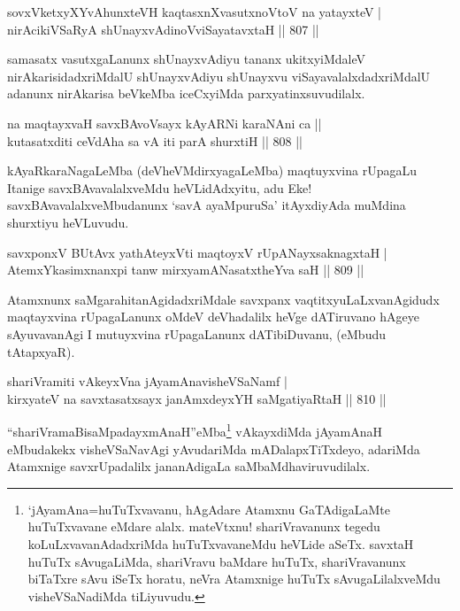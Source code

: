 \begin{shl}
sovxVketxyXYvAhunxteVH kaqtasxnXvasutxnoV\s toV na yatayxteV | \\
nirAcikiVSaRyA shUnayxvAdinoV\s viSayatavxtaH \hfill||  807 ||  
\end{shl}

\begin{artha}
samasatx vasutxgaLanunx shUnayxvAdiyu tananx ukitxyiMdaleV nirAkarisidadxriMdalU shUnayxvAdiyu shUnayxvu viSayavalalxdadxriMdalU adanunx nirAkarisa beVkeMba iceCxyiMda parxyatinxsuvudilalx.
\end{artha}


\begin{shl}
na maqtayxvaH savxBAvoV\s sayx kAyARNi karaNAni ca ||  \\
kutasatxditi ceVdAha sa vA iti parA shurxtiH \hfill||  808 ||  
\end{shl}

\begin{artha}
kAyaRkaraNagaLeMba (deVheVMdirxyagaLeMba) maqtuyxvina rUpagaLu Itanige savxBAvavalalxveMdu heVLidAdxyitu, adu Eke! savxBAvavalalxveMbudanunx `savA ayaMpuruSa' itAyxdiyAda muMdina shurxtiyu heVLuvudu.
\end{artha}


\begin{shl}
savxponxV BUtAvx yathA\s teyxVti maqtoyxV rUpANayxsaknagxtaH | \\
AtemxYkasimxnanxpi tanw mirxyamANasatxtheYva saH \hfill||  809 ||  
\end{shl}

\begin{artha}
Atamxnunx saMgarahitanAgidadxriMdale savxpanx vaqtitxyuLaLxvanAgidudx maqtayxvina rUpagaLanunx oMdeV deVhadalilx heVge dATiruvano hAgeye sAyuvavanAgi I mutuyxvina rUpagaLanunx dATibiDuvanu, (eMbudu tAtapxyaR).
\end{artha}

\begin{shl}
shariVramiti vAkeyxVna jAyamAnavisheVSaNamf | \\
kirxyateV na savxtasatxsayx janAmxdeyxYH saMgatiyaRtaH \hfill||  810 ||  
\end{shl}

\begin{artha}
``shariVramaBisaMpadayxmAnaH''eMba\footnote{`jAyamAna=huTuTxvavanu, hAgAdare Atamxnu GaTAdigaLaMte huTuTxvavane eMdare alalx. mateVtxnu! shariVravanunx tegedu koLuLxvavanAdadxriMda huTuTxvavaneMdu heVLide aSeTx. savxtaH huTuTx sAvugaLiMda, shariVravu baMdare huTuTx, shariVravanunx biTaTxre sAvu iSeTx horatu, neVra Atamxnige huTuTx sAvugaLilalxveMdu visheVSaNadiMda tiLiyuvudu.} vAkayxdiMda jAyamAnaH eMbudakekx visheVSaNavAgi yAvudariMda mADalapxTiTxdeyo, adariMda Atamxnige savxrUpadalilx jananAdigaLa saMbaMdhaviruvudilalx.
\end{artha}

